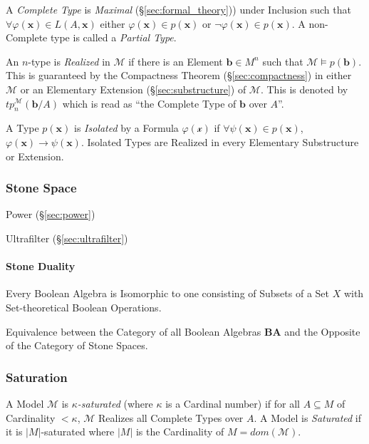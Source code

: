 A \emph{Complete Type} is \emph{Maximal} (\S\ref{sec:formal_theory}))
under Inclusion such that $\forall \varphi(\mathbf{x}) \in
L(A,\mathbf{x})$ either $\varphi(\mathbf{x}) \in p(\mathbf{x})$ or
$\neg \varphi(\mathbf{x}) \in p(\mathbf{x})$. A non-Complete type is
called a \emph{Partial Type}.

An $n$-type is \emph{Realized} in $\mathcal{M}$ if there is an Element
$\mathbf{b} \in M^n$ such that $\mathcal{M} \models p(\mathbf{b})$.
This is guaranteed by the Compactness Theorem
(\S\ref{sec:compactness}) in either $\mathcal{M}$ or an Elementary
Extension (\S\ref{sec:substructure}) of $\mathcal{M}$. This is denoted
by $tp_{n}^{\mathcal{M}}(\mathbf{b}/A)$ which is read as ``the
Complete Type of $\mathbf{b}$ over $A$''.

A Type $p(\mathbf{x})$ is \emph{Isolated} by a Formula
$\varphi(\mathcal{x})$ if $\forall \psi(\mathbf{x}) \in
p(\mathbf{x})$, $\varphi (\mathbf{x}) \rightarrow
\psi(\mathbf{x})$. Isolated Types are Realized in every Elementary
Substructure or Extension.



\subsubsection{Stone Space}\label{sec:stone_space}

Power (\S\ref{sec:power})

Ultrafilter (\S\ref{sec:ultrafilter})



\paragraph{Stone Duality}\label{sec:stone_duality}\hfill

Every Boolean Algebra is Isomorphic to one consisting of Subsets of a
Set $X$ with Set-theoretical Boolean Operations.

Equivalence between the Category of all Boolean Algebras $\mathbf{BA}$
and the Opposite of the Category of Stone Spaces.



\subsubsection{Saturation}\label{sec:model_saturation}

A Model $\mathcal{M}$ is \emph{$\kappa$-saturated} (where $\kappa$ is
a Cardinal number) if for all $A \subseteq M$ of Cardinality $<
\kappa$, $\mathcal{M}$ Realizes all Complete Types over $A$. A Model
is \emph{Saturated} if it is $|M|$-saturated where $|M|$ is the
Cardinality of $M = dom(\mathcal{M})$.



